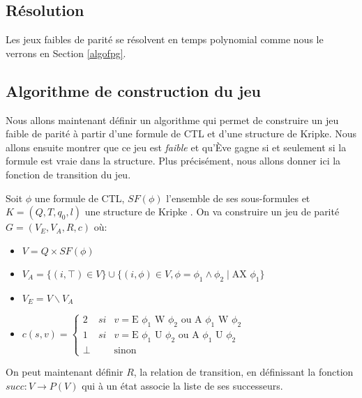 \documentclass[10pt,a4paper]{article}
\begin{document}
\subsection{Résolution}
Les jeux faibles de parité se résolvent en temps polynomial comme nous le verrons en Section \ref{algofpg}.

\subsection{Algorithme de construction du jeu}
Nous allons maintenant définir un algorithme qui permet de construire un jeu faible de parité à partir d'une formule de CTL et d'une structure de Kripke. Nous allons ensuite montrer que ce jeu est \emph{faible} et qu'Ève gagne si et seulement si la formule est vraie dans la structure. Plus précisément, nous allons donner ici la fonction de transition du jeu.

Soit $\phi$ une formule de CTL, $SF(\phi)$ l'ensemble de ses sous-formules et $K = (Q,T,q_0,l)$  une structure de Kripke .
On va construire un jeu de parité $G = (V_E,V_A,R,c)$ où:
\begin{itemize}
	\item $V = Q \times SF(\phi)$
	\item $V_A = \{(i, \top ) \in V\} \cup \{(i, \phi) \in V, \phi = \phi_1 \land \phi_2 \mid \mbox{AX } \phi_1 \}$
	\item $V_E = V \backslash V_A$
	\item $c(s,v) = \left \{
	\begin{array}{rcl}
		2 & si & v = \mbox{E } \phi_1 \mbox{ W } \phi_2\text{ ou }\mbox{A } \phi_1 \mbox{ W } \phi_2\\
		1 & si & v = \mbox{E } \phi_1 \mbox{ U } \phi_2\text{ ou }\mbox{A } \phi_1 \mbox{ U } \phi_2\\
		\bot && \text{sinon}
	\end{array}
	\right .$
\end{itemize}

\bigskip

On peut maintenant définir $R$, la relation de transition, en définissant la fonction $succ : V \to P(V)$ qui à un état associe la liste de ses successeurs.\\
\end{document}
